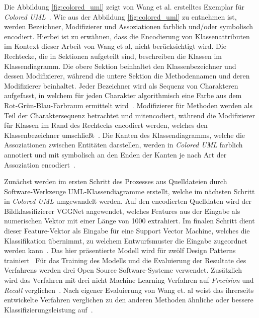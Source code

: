 Die Abbildung \ref{fig:colored_uml} zeigt von Wang et al. erstelltes Exemplar für \textit{Colored UML}~\cite[S. 11]{app12178718}. Wie aus der Abbildung \ref{fig:colored_uml} zu entnehmen ist, werden Bezeichner, Modifizierer und Assoziationen farblich und/oder symbolisch encodiert.
Hierbei ist zu erwähnen, dass die Encodierung von Klassenattributen im Kontext dieser Arbeit von Wang et al, nicht berücksichtigt wird.
Die Rechtecke, die in Sektionen aufgeteilt sind, beschreiben die Klassen im Klassendiagramm. Die obere Sektion beinhaltet den Klassenbezeichner und dessen Modifizierer, während die untere Sektion die Methodennamen und deren Modifizierer beinhaltet. 
Jeder Bezeichner wird als Sequenz von Charakteren aufgefasst, in welchem für jeden Charakter algorithmisch eine Farbe aus dem Rot-Grün-Blau-Farbraum ermittelt wird~\cite[S. 9, S. 10]{app12178718}.
Modifizierer für Methoden werden als Teil der Charaktersequenz betrachtet und mitencodiert, während die Modifizierer für Klassen im Rand des Rechtecks encodiert werden, welches den Klassenbezeichner umschließt~\cite[S. 6]{app12178718}.
Die Kanten des Klassendiagramms, welche die Assoziationen zwischen Entitäten darstellen, werden in \textit{Colored UML} farblich annotiert und mit symbolisch an den Enden der Kanten je nach Art der Assoziation encodiert~\cite[S. 6]{app12178718}.

Zunächst werden im ersten Schritt des Prozesses aus Quelldateien durch Software-Werkzeuge UML-Klassendiagramme erstellt, welche im nächsten Schritt in \textit{Colored UML} umgewandelt werden.
Auf den encodierten Quelldaten wird der Bildklassifizierer VGGNet angewendet, welches Features aus der Eingabe als numerischen Vektor mit einer Länge von 1000 extrahiert. Im finalen Schritt dient dieser Feature-Vektor als Eingabe für eine Support Vector Machine, welches die Klassifikation übernimmt, zu welchem Entwurfsmuster die Eingabe zugeordnet werden kann~\cite[S. 13]{app12178718}.
Das hier präsentierte Modell wird für zwölf Design Patterns trainiert~\cite[S. 15]{app12178718}
Für das Training des Modells und die Evaluierung der Resultate des Verfahrens werden drei Open Source Software-Systeme verwendet. Zusätzlich wird das Verfahren mit drei nicht Machine Learning-Verfahren auf \textit{Precision} und \textit{Recall} verglichen~\cite[S. 20]{app12178718}.
Nach eigener Evaluierung von Wang et. al weist das ihrerseits entwickelte Verfahren verglichen zu den anderen Methoden ähnliche oder bessere Klassifizierungsleistung auf~\cite[S. 22]{app12178718}.

\pagebreak

